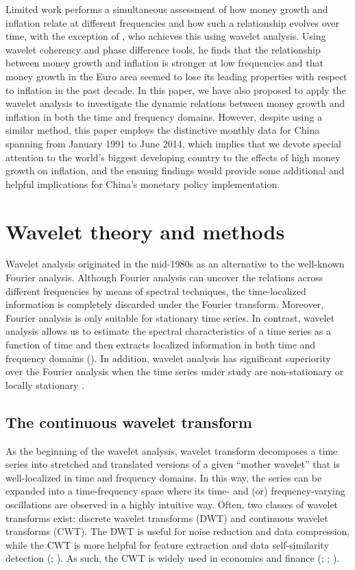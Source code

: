\documentclass[a4paper,fleqn]{cas-sc}
\begin{document}
Limited work performs a simultaneous assessment of how money growth and inflation relate at different frequencies and how such a relationship evolves over time, with the exception of \cite{Rua2012}, who achieves this using wavelet analysis. Using wavelet coherency and phase difference tools, he finds that the relationship between money growth and inflation is stronger at low frequencies and that money growth in the Euro area seemed to lose its leading properties with respect to inflation in the past decade. In this paper, we have also proposed to apply the wavelet analysis to investigate the dynamic relations between money growth and inflation in both the time and frequency domains. However, despite using a similar method, this paper employs the distinctive monthly data for China spanning from January 1991 to June 2014, which implies that we devote special attention to the world's biggest developing country to the effects of high money growth on inflation, and the ensuing findings would provide some additional and helpful implications for China's monetary policy implementation.

\section{Wavelet theory and methods}\label{sec:3}
Wavelet analysis originated in the mid-1980s as an alternative to the well-known Fourier analysis. Although Fourier analysis can uncover the relations across different frequencies by means of spectral techniques, the time-localized information is completely discarded under the Fourier transform. Moreover, Fourier analysis is only suitable for stationary time series. In contrast, wavelet analysis allows us to estimate the spectral characteristics of a time series as a function of time and then extracts localized information in both time and frequency domains (\citealp{AGUIARCONRARIA2008}). In addition, wavelet analysis has significant superiority over the Fourier analysis when the time series under study are non-stationary or locally stationary \cite{ROUEFF2011813}.

\subsection{The continuous wavelet transform}
As the beginning of the wavelet analysis, wavelet transform decomposes a time series into stretched and translated versions of a given “mother wavelet” that is well-localized in time and frequency domains. In this way, the series can be expanded into a time-frequency space where its time- and (or) frequency-varying oscillations are observed in a highly intuitive way. Often, two classes of wavelet transforms exist: discrete wavelet transforms (DWT) and continuous wavelet transforms (CWT). The DWT is useful for noise reduction and data compression, while the CWT is more helpful for feature extraction and data self-similarity detection (\citealp*{grinsted2004}; \citealp*{loh2013}). As such, the CWT is widely used in economics and finance (\citealp{AGUIARCONRARIA2008}; \citealp{caraiani2012}; \citealp{Rua2012}).
\end{document}
